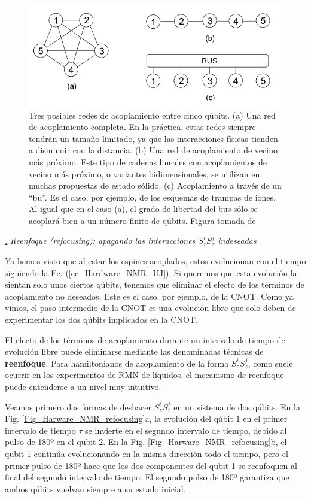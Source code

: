 \documentclass[a4paper,11pt]{book} %
\numberwithin{equation}{chapter}
\def\subsubiContadorIt{\par\addtocounter{subsubsection}{1}\underline{\it\thesubsubsection.}\hskip0.5cm \setcounter{subsubsubsectionIt}{0}}
\newcommand{\SubsubiIt}[1]{
		\subsubiContadorIt \textit{#1}
	}
\newcounter{subsubsubsectionIt}[subsubsection]
\begin{document}
	\begin{figure}[H]
	\centering 
	\includegraphics[width=0.65\linewidth]{Figuras/Fig_Harware_NMR_posible_couplings.png}
	\caption{Tres posibles redes de acoplamiento entre cinco qúbits. (a) Una red de acoplamiento completa. En la práctica, estas redes siempre tendrán un tamaño limitado, ya que las interacciones físicas tienden a disminuir con la distancia. (b) Una red de acoplamiento de vecino más próximo. Este tipo de cadenas lineales con acoplamientos de vecino más próximo, o variantes bidimensionales, se utilizan en muchas propuestas de estado sólido. (c) Acoplamiento a través de un ``bu''. Es el caso, por ejemplo, de los esquemas de trampas de iones. Al igual que en el caso (a), el grado de libertad del bus sólo se acoplará bien a un número finito de qúbits. Figura tomada de \cite{bib_NMR_hardware}}
	\label{Fig_Harware_NMR_posible_couplings}
	\end{figure}






			\SubsubiIt{Reenfoque (refocusing): apagando las interacciones $S_z^i S_z^j$ indeseadas} 

Ya hemos visto que al estar los espines acoplados, estos evolucionan con el tiempo siguiendo la Ec. (\ref{ec_Hardware_NMR_UJ}). Si queremos que esta evolución la sientan solo unos ciertos qúbits, tenemos que eliminar el efecto de los términos de acoplamiento no deseados. Este es el caso, por ejemplo, de la CNOT. Como ya vimos, el paso intermedio de la CNOT es una evolución libre que solo deben de experimentar los dos qúbits implicados en la CNOT. 

El efecto de los términos de acoplamiento durante un intervalo de tiempo de evolución libre puede eliminarse mediante las denominadas técnicas de \textbf{reenfoque}.  Para hamiltonianos de acoplamiento de la forma $S_z^i S_z^j$, como suele ocurrir en los experimentos de RMN de líquidos, el mecanismo de reenfoque puede entenderse a un nivel muy intuitivo. 

Veamos primero dos formas de deshacer $S_z^i S_z^j$ en un sistema de dos qúbits. En la Fig. \ref{Fig_Harware_NMR_refocusing}a, la evolución del qúbit 1 en el primer intervalo de tiempo $\tau$ se invierte en el segundo intervalo de tiempo, debido al pulso de 180º en el qubit 2. En la Fig. \ref{Fig_Harware_NMR_refocusing}b, el qubit 1 continúa evolucionando en la misma dirección todo el tiempo, pero el primer pulso de 180º hace que los dos componentes del qubit 1 se reenfoquen al final del segundo intervalo de tiempo. El segundo pulso de 180º garantiza que ambos qúbits vuelvan siempre a su estado inicial.
\end{document}

